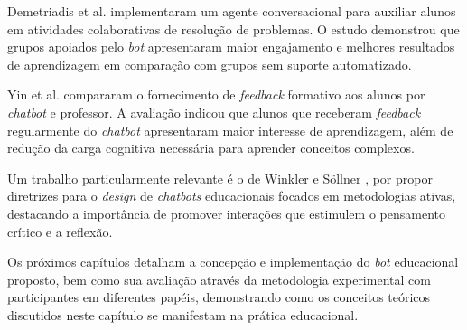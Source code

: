 Demetriadis et al. \cite{demetriadis2018} implementaram um agente conversacional
para auxiliar alunos em atividades colaborativas de resolução de problemas. O
estudo demonstrou que grupos apoiados pelo \textit{bot} apresentaram maior
engajamento e melhores resultados de aprendizagem em comparação com grupos sem
suporte automatizado.

Yin et al. \cite{yin2024} compararam o fornecimento de \textit{feedback}
formativo aos alunos por \textit{chatbot} e professor. A avaliação indicou que
alunos que receberam \textit{feedback} regularmente do \textit{chatbot}
apresentaram maior interesse de aprendizagem, além de redução da carga cognitiva
necessária para aprender conceitos complexos.

Um trabalho particularmente relevante é o de Winkler e Söllner
\cite{winkler2018}, por propor diretrizes para o \textit{design} de
\textit{chatbots} educacionais focados em metodologias ativas, destacando a
importância de promover interações que estimulem o pensamento crítico e a
reflexão.

Os próximos capítulos detalham a concepção e implementação do \textit{bot} 
educacional proposto, bem como sua avaliação através da metodologia experimental
com participantes em diferentes papéis, demonstrando como os conceitos teóricos
discutidos neste capítulo se manifestam na prática educacional.
